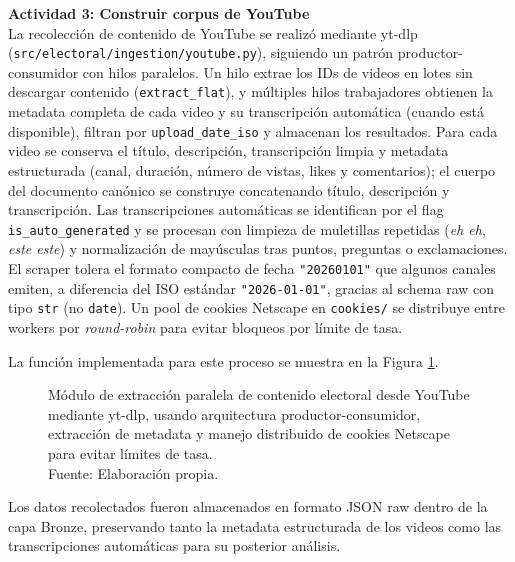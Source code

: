 \textbf{Actividad 3: Construir corpus de YouTube}
\\
La recolección de contenido de YouTube se realizó mediante yt-dlp
(\texttt{src/electoral/ingestion/youtube.py}), siguiendo un patrón
productor-consumidor con hilos paralelos. Un hilo extrae los IDs de videos en lotes
sin descargar contenido (\texttt{extract\_flat}), y múltiples hilos trabajadores
obtienen la metadata completa de cada video y su transcripción automática (cuando
está disponible), filtran por \texttt{upload\_date\_iso} y almacenan los resultados.
Para cada video se conserva el título, descripción, transcripción limpia y
metadata estructurada (canal, duración, número de vistas, likes y comentarios);
el cuerpo del documento canónico se construye concatenando título, descripción y
transcripción. Las transcripciones automáticas se identifican por el flag
\texttt{is\_auto\_generated} y se procesan con limpieza de muletillas repetidas
(\textit{eh eh}, \textit{este este}) y normalización de mayúsculas tras puntos,
preguntas o exclamaciones. El scraper tolera el formato compacto de fecha
\texttt{"20260101"} que algunos canales emiten, a diferencia del ISO estándar
\texttt{"2026-01-01"}, gracias al schema raw con tipo \texttt{str} (no
\texttt{date}). Un pool de cookies Netscape en \texttt{cookies/} se distribuye
entre workers por \textit{round-robin} para evitar bloqueos por límite de tasa.

La función implementada para este proceso se muestra en la Figura \ref{5:fig5}.

\begin{figure}[!ht]
    \begin{center}
        
        \caption[Módulo paralelo de extracción de contenido electoral desde YouTube mediante yt-dlp]{Módulo de extracción paralela de contenido electoral desde YouTube mediante yt-dlp, usando arquitectura productor-consumidor, extracción de metadata y manejo distribuido de cookies Netscape para evitar límites de tasa.\\Fuente: Elaboración propia.}
        \label{5:fig5}
    \end{center}
\end{figure}

Los datos recolectados fueron almacenados en formato JSON raw dentro de la capa
Bronze, preservando tanto la metadata estructurada de los videos como las
transcripciones automáticas para su posterior análisis.

